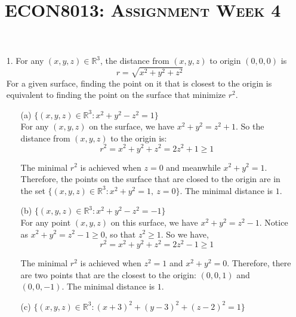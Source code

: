\documentclass{article}
\begin{document}
\title{\textsc{ECON8013: Assignment Week 4}}\maketitle

\begin{enumerate}
    \item[1. ] For any $(x,y,z) \in \mathbb{R}^3$, the distance from $(x,y,z)$ to origin $(0,0,0)$ is 
    $$ r = \sqrt{x^2 + y^2 + z^2} $$
    For a given surface, finding the point on it that is closest to the origin is equivalent to 
    finding the point on the surface that minimize $r^2$.
    
        \begin{enumerate}
            \item[(a)] $\{(x,y,z) \in \mathbb{R}^3: x^2 + y^2 - z^2 = 1 \}$ \\
            
            For any $(x,y,z)$ on the surface, we have $x^2 + y^2 = z^2 + 1$.
            So the distance from $(x,y,z)$ to the origin is:
            $$ r^2= x^2 + y^2 + z^2 = 2 z^2 + 1 \geq 1  $$
            
            The minimal $r^2$ is achieved when $z=0$ and meanwhile $x^2 + y^2=1$. \\
            
            Therefore, the points on the surface that are closed to the origin are in the set
            $\{ (x,y,z) \in \mathbb{R}^3: x^2 + y^2 =1,\ z=0 \}$. The minimal distance is $1$. \\
            
            \item[(b)] $\{(x,y,z) \in \mathbb{R}^3: x^2 + y^2 - z^2 = -1 \}$ \\
            
            For any point $(x,y,z)$ on this surface, we have $x^2 + y^2 = z^2 - 1$.
            Notice as $x^2 + y^2 = z^2 - 1 \geq 0$, so that $z^2 \geq 1$. So we have, 
            $$ r^2= x^2 + y^2 + z^2 = 2 z^2 - 1 \geq 1  $$
            
            The minimal $r^2$ is achieved when $z^2=1$ and $x^2 + y^2=0$. Therefore, 
            there are two points that are the closest to the origin: $(0,0,1)$ and $(0,0,-1)$.
            The minimal distance is $1$. \\
            
            \item[(c)] $\{(x,y,z) \in \mathbb{R}^3: (x+3)^2 + (y-3)^2 + (z-2)^2 = 1 \}$ \\
            

\end{enumerate}
\end{enumerate}
\end{document}
